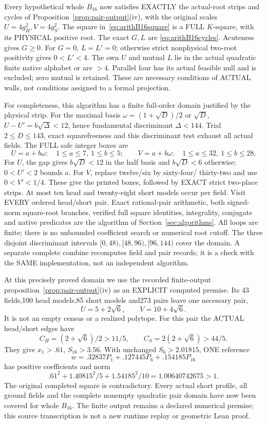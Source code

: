 \documentclass[11pt]{article}
\begin{document}
Every hypothetical whole \(B_{16}\) now satisfies
EXACTLY the actual-root strips and cycles of
Proposition~\ref{prop:pair-output}(iv), with the
original scales \(U=4g_H^2,V=4g_S^2\).
The square in~\eqref{eq:arithB16square} is a FULL
\(K\)-square, with its PHYSICAL positive root.
The exact \(G,L\) are
\eqref{eq:arithB16cycles}.
Acuteness gives \(G\ge0\).
For \(G=0\), \(L=L'=0\); otherwise strict
nonphysical two-root positivity gives \(0<L'<4\).
The own \(U\) and mutual \(L\) lie in the actual
quadratic finite native alphabet or are \(>4\).
Parallel four has its actual feasible null and
is excluded; zero mutual is retained.
These are necessary conditions of ACTUAL walls,
not conditions assigned to a formal projection.

For completeness, this algorithm has a finite
full-order domain justified by the physical strip.
For the maximal basis
\(\omega=(1+\sqrt D)/2\) or \(\sqrt D\),
\(U-U'=b\sqrt\Delta<12\), hence
fundamental discriminant \(\Delta<144\).
Trial \(2\le D\le143\), exact squarefreeness and
this discriminant test exhaust all actual fields.
The FULL safe integer boxes are
\[
 U=a+b\omega:\quad1\le a\le7,\ 1\le b\le5;\qquad
 V=a+b\omega:\quad1\le a\le32,\ 1\le b\le28 .
\]
For \(U\), the gap gives \(b\sqrt D<12\)
in the half basis and \(b\sqrt D<6\) otherwise;
\(0<U'<2\) bounds \(a\).
For \(V\), replace twelve/six by sixty-four/
thirty-two and use \(0<V'<1/4\).
These give the printed boxes, followed by EXACT
strict two-place strips.
At most ten head and twenty-eight short models
occur per field.
Visit EVERY ordered head/short pair.
Exact rational-pair arithmetic, both signed-norm
square-root branches, verified full square identities,
integrality, conjugate and native predicates are
the algorithm of Section~\ref{sec:algorithms}.
All loops are finite; there is no unbounded
coefficient search or numerical root cutoff.
The three disjoint discriminant intervals
\([0,48),[48,96),[96,144)\) cover the domain.
A separate complete combine recomputes field and
pair records; it is a check with the SAME
implementation, not an independent algorithm.

At this precisely proved domain we use the recorded
finite-output proposition~\ref{prop:pair-output}(iv)
as an EXPLICIT computed premise.
Its 43 fields,100 head models,85 short models
and273 pairs leave one necessary pair,
\[
                  U=5+2\sqrt6,\qquad V=10+4\sqrt6 .
\]
It is not an empty census or a realized polytope.
For this pair the ACTUAL head/short edges have
\[
 C_H=(2+\sqrt6)/2>11/5,\qquad
 C_S=2(2+\sqrt6)>44/5.
\]
They give \(x_1>.61\), \(S_{16}>3.56\).
With unchanged \(S_6>2.01815\), ONE reference
\[
                  w=.32837P_1+.127445P_6+.154185P_{16}
\]
has positive coefficients and norm
\[
                  .61^2+1.40815^2/5+1.54185^2/10
                              =1.00640742675>1 .
\]
The original completed square is contradictory.
Every actual short profile, all ground fields and
the complete nonempty quadratic pair domain have
now been covered for whole \(B_{16}\).
The finite output remains a declared numerical
premise; this source transcription is not a
new runtime replay or geometric Lean proof.
\end{document}
